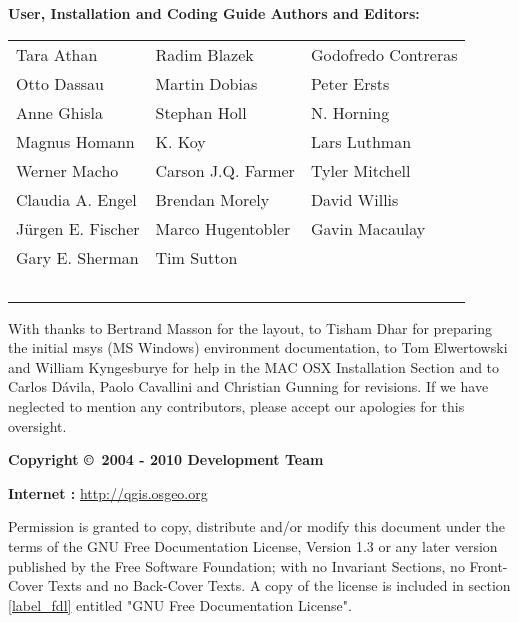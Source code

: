 \begin{flushleft}
\textbf{User, Installation and Coding Guide Authors and Editors:}
  \par\bigskip\noindent
\begin{tabular}{p{4cm} p{4cm} p{4cm}}
Tara Athan & Radim Blazek & Godofredo Contreras \\
Otto Dassau & Martin Dobias & Peter Ersts \\
Anne Ghisla & Stephan Holl & N. Horning \\
Magnus Homann & K. Koy & Lars Luthman \\ 
Werner Macho & Carson J.Q. Farmer & Tyler Mitchell \\
Claudia A. Engel & Brendan Morely & David Willis \\
Jürgen E. Fischer & Marco Hugentobler & Gavin Macaulay \\
Gary E. Sherman & Tim Sutton \\ \
\end{tabular}
\end{flushleft}

With thanks to Bertrand Masson for the layout, to Tisham Dhar for preparing the initial msys (MS Windows)
environment documentation, to Tom Elwertowski and William Kyngesburye for
help in the MAC OSX Installation Section and to Carlos Dávila, Paolo
Cavallini and Christian Gunning for revisions. If we have neglected to 
mention any contributors, please accept our apologies for this oversight.
\par\bigskip\noindent
\textbf{Copyright \copyright~2004 - 2010 \QG Development Team}
\par\bigskip\noindent
\textbf{Internet :} \url{http://qgis.osgeo.org}

\newpage


Permission is granted to copy, distribute and/or modify this document under 
the terms of the GNU Free Documentation License, Version 1.3 or any later 
version published by the Free Software Foundation; with no Invariant 
Sections, no Front-Cover Texts and no Back-Cover Texts.  A copy of the 
license is included in section \ref{label_fdl} entitled "GNU Free Documentation 
License".
